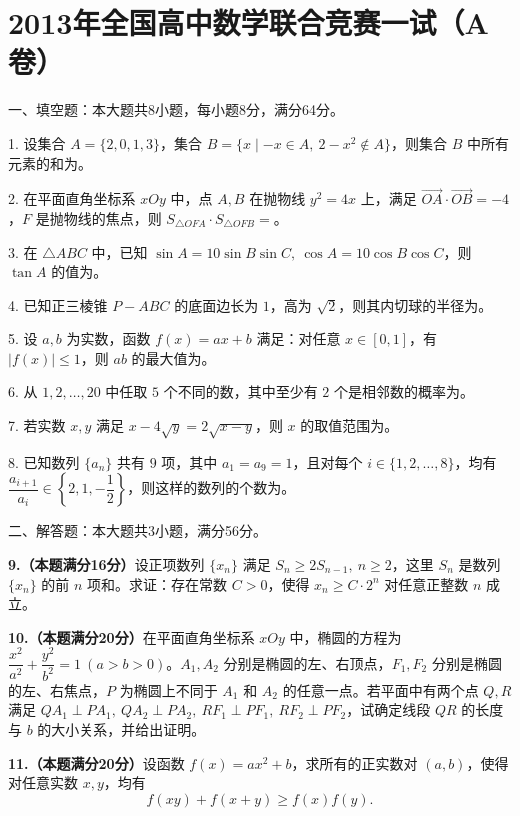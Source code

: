 \documentclass[11pt]{ctexart}
\begin{document}
\sloppy
\newcommand{\blank}{\underline{\hspace{3em}}}
\clearpage
\section*{2013年全国高中数学联合竞赛一试（A卷）}

一、填空题：本大题共8小题，每小题8分，满分64分。

1. 设集合 $A=\{2,0,1,3\}$，集合 $B=\{x\mid -x\in A,\ 2-x^2\notin A\}$，则集合 $B$ 中所有元素的和为\blank{}。

2. 在平面直角坐标系 $xOy$ 中，点 $A,B$ 在抛物线 $y^2=4x$ 上，满足 $\overrightarrow{OA}\cdot\overrightarrow{OB}=-4$，$F$ 是抛物线的焦点，则 $S_{\triangle OFA}\cdot S_{\triangle OFB}=$\blank{}。

3. 在 $\triangle ABC$ 中，已知 $\sin A=10\sin B\sin C,\ \cos A=10\cos B\cos C$，则 $\tan A$ 的值为\blank{}。

4. 已知正三棱锥 $P-ABC$ 的底面边长为 $1$，高为 $\sqrt2$，则其内切球的半径为\blank{}。

5. 设 $a,b$ 为实数，函数 $f(x)=ax+b$ 满足：对任意 $x\in[0,1]$，有 $|f(x)|\le1$，则 $ab$ 的最大值为\blank{}。

6. 从 $1,2,\dots,20$ 中任取 $5$ 个不同的数，其中至少有 $2$ 个是相邻数的概率为\blank{}。

7. 若实数 $x,y$ 满足 $x-4\sqrt y=2\sqrt{x-y}$，则 $x$ 的取值范围为\blank{}。

8. 已知数列 $\{a_n\}$ 共有 $9$ 项，其中 $a_1=a_9=1$，且对每个 $i\in\{1,2,\dots,8\}$，均有 $\dfrac{a_{i+1}}{a_i}\in\left\{2,1,-\dfrac12\right\}$，则这样的数列的个数为\blank{}。

二、解答题：本大题共3小题，满分56分。


\clearpage
\textbf{9.（本题满分16分）}设正项数列 $\{x_n\}$ 满足 $S_n\ge 2S_{n-1},\ n\ge2$，这里 $S_n$ 是数列 $\{x_n\}$ 的前 $n$ 项和。求证：存在常数 $C>0$，使得 $x_n\ge C\cdot2^n$ 对任意正整数 $n$ 成立。

\clearpage
\textbf{10.（本题满分20分）}在平面直角坐标系 $xOy$ 中，椭圆的方程为 $\dfrac{x^2}{a^2}+\dfrac{y^2}{b^2}=1\ (a>b>0)$。$A_1,A_2$ 分别是椭圆的左、右顶点，$F_1,F_2$ 分别是椭圆的左、右焦点，$P$ 为椭圆上不同于 $A_1$ 和 $A_2$ 的任意一点。若平面中有两个点 $Q,R$ 满足 $QA_1\perp PA_1,\ QA_2\perp PA_2,\ RF_1\perp PF_1,\ RF_2\perp PF_2$，试确定线段 $QR$ 的长度与 $b$ 的大小关系，并给出证明。

\clearpage
\textbf{11.（本题满分20分）}设函数 $f(x)=ax^2+b$，求所有的正实数对 $(a,b)$，使得对任意实数 $x,y$，均有
$$
f(xy)+f(x+y)\ge f(x)f(y).
$$
\end{document}

